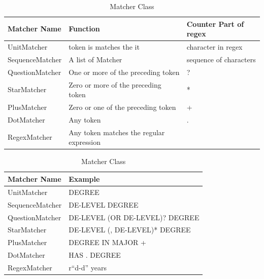 \begin{table}[ht]
\caption{Matcher Class } %
\centering %
\begin{tabular}{  | l | l | l |  }
 \hline
 Matcher Name        &  Function                                 & Counter Part of regex    \\
 \hline
 UnitMatcher       &  token is matches the it                  & character  in regex       \\
 \hline
 SequenceMatcher   &  A list of Matcher                        & sequence of characters       \\
  \hline
 QuestionMatcher   &  One or more of the preceding token       & ?       \\
  \hline
 StarMatcher       &  Zero or more of the preceding token      & *       \\
  \hline
 PlusMatcher       &  Zero or one of the preceding token       & +       \\
  \hline
 DotMatcher        &  Any token                                & .      \\
  \hline
 RegexMatcher      &  Any token matches the regular expression               &        \\
  \hline
\end{tabular}
\label{tab:matchers} %
\end{table}



\begin{table}[ht]
\caption{Matcher Class } %
\centering %
\begin{tabular}{  | l |  l |  }
 \hline
 Matcher Name          & Example    \\
 \hline
 UnitMatcher         & DEGREE       \\
 \hline
 SequenceMatcher     & DE-LEVEL DEGREE       \\
  \hline
 QuestionMatcher     & DE-LEVEL (OR DE-LEVEL)?  DEGREE       \\
  \hline
 StarMatcher         & DE-LEVEL (, DE-LEVEL)*  DEGREE       \\
  \hline
 PlusMatcher         & DEGREE IN MAJOR +      \\
  \hline
 DotMatcher          & HAS . DEGREE      \\
  \hline
 RegexMatcher        & r``d-d'' years  \\
  \hline

\end{tabular}
\label{tab:matchers_example} %
\end{table}


